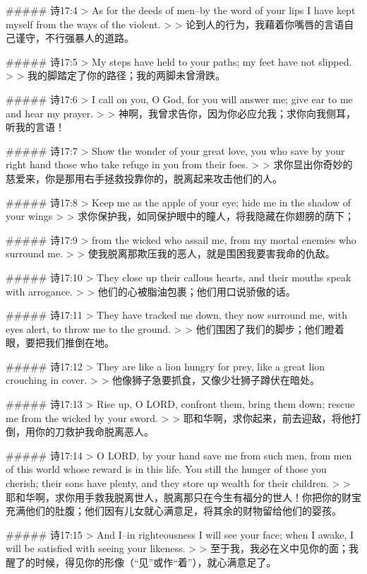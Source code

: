 ##### 诗17:4
> As for the deeds of men--by the word of your lips I have kept myself from the ways of the violent.
>
> 论到人的行为，我藉着你嘴唇的言语自己谨守，不行强暴人的道路。


##### 诗17:5
> My steps have held to your paths; my feet have not slipped.
>
> 我的脚踏定了你的路径；我的两脚未曾滑跌。


##### 诗17:6
> I call on you, O God, for you will answer me; give ear to me and hear my prayer.
>
> 神啊，我曾求告你，因为你必应允我；求你向我侧耳，听我的言语！


##### 诗17:7
> Show the wonder of your great love, you who save by your right hand those who take refuge in you from their foes.
>
> 求你显出你奇妙的慈爱来，你是那用右手拯救投靠你的，脱离起来攻击他们的人。


##### 诗17:8
> Keep me as the apple of your eye; hide me in the shadow of your wings
>
> 求你保护我，如同保护眼中的瞳人，将我隐藏在你翅膀的荫下；


##### 诗17:9
> from the wicked who assail me, from my mortal enemies who surround me.
>
> 使我脱离那欺压我的恶人，就是围困我要害我命的仇敌。


##### 诗17:10
> They close up their callous hearts, and their mouths speak with arrogance.
>
> 他们的心被脂油包裹；他们用口说骄傲的话。


##### 诗17:11
> They have tracked me down, they now surround me, with eyes alert, to throw me to the ground.
>
> 他们围困了我们的脚步；他们瞪着眼，要把我们推倒在地。


##### 诗17:12
> They are like a lion hungry for prey, like a great lion crouching in cover.
>
> 他像狮子急要抓食，又像少壮狮子蹲伏在暗处。


##### 诗17:13
> Rise up, O LORD, confront them, bring them down; rescue me from the wicked by your sword.
>
> 耶和华啊，求你起来，前去迎敌，将他打倒，用你的刀救护我命脱离恶人。


##### 诗17:14
> O LORD, by your hand save me from such men, from men of this world whose reward is in this life. You still the hunger of those you cherish; their sons have plenty, and they store up wealth for their children.
>
> 耶和华啊，求你用手救我脱离世人，脱离那只在今生有福分的世人！你把你的财宝充满他们的肚腹；他们因有儿女就心满意足，将其余的财物留给他们的婴孩。


##### 诗17:15
> And I--in righteousness I will see your face; when I awake, I will be satisfied with seeing your likeness.
>
> 至于我，我必在义中见你的面；我醒了的时候，得见你的形像（“见”或作“着”），就心满意足了。


